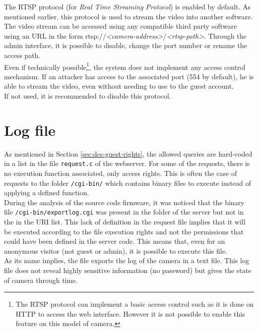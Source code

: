 The RTSP protocol (for \emph{Real Time Streaming Protocol}) is enabled by default.
As mentioned earlier, this protocol is used to stream the video into another software.
The video stream can be accessed using any compatible third party software using an URL in the form rtsp://\emph{\textless camera-address\textgreater}/\emph{\textless rtsp-path\textgreater}.
Through the admin interface, it is possible to disable, change the port number or rename the access path.\\

Even if technically possible\footnote{The RTSP protocol can implement a basic access control such as it is done on HTTP to access the web interface. However it is not possible to enable this feature on this model of camera.}, the system does not implement any access control mechanism.
If an attacker has access to the associated port (554 by default), he is able to stream the video, even without needing to use to the guest account.\\

If not used, it is recommended to disable this protocol.

\section{Log file}
\label{sec:dcs-log}

As mentioned in Section \ref{sec:dcs-guest-rights}, the allowed queries are hard-coded in a list in the file \texttt{request.c} of the webserver.
For some of the requests, there is no execution function associated, only access rights.
This is often the case of requests to the folder \texttt{/cgi-bin/} which contains binary files to execute instead of applying a defined function.\\

During the analysis of the source code firmware, it was noticed that the binary file \texttt{/cgi-bin/exportlog.cgi} was present in the folder of the server but not in the in the URI list.
This lack of definition in the request file implies that it will be executed according to the file execution rights and not the permissions that could have been defined in the server code.
This means that, even for an anonymous visitor (not guest or admin), it is possible to execute this file.\\

As its name implies, the file exports the log of the camera in a text file.
This log file does not reveal highly sensitive information (no password) but gives the state of camera through time.

